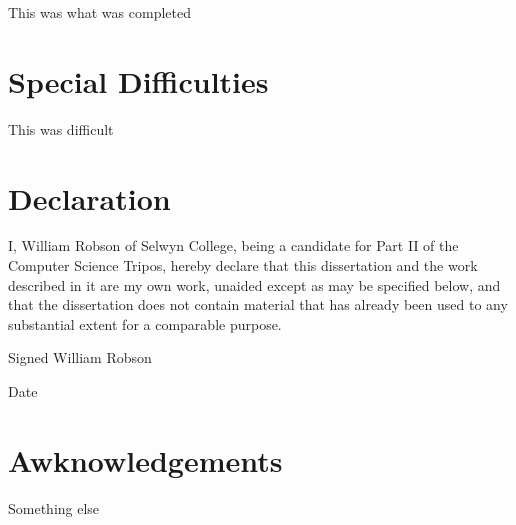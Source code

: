 This was what was completed

\section*{Special Difficulties}

This was difficult

\pagebreak

\section*{Declaration}

I, William Robson of Selwyn College, being a candidate for Part II of the Computer Science Tripos, hereby declare that this dissertation and the work described in it are my own work, unaided except as may be specified below, and that the dissertation does not contain material that has already been used to any substantial extent for a comparable purpose. 

Signed William Robson

Date \thedate 

\cleardoublepage

\tableofcontents
\listoffigures

\newpage

\section*{Awknowledgements}

Something else

\cleardoublepage
\setcounter{page}{1}
